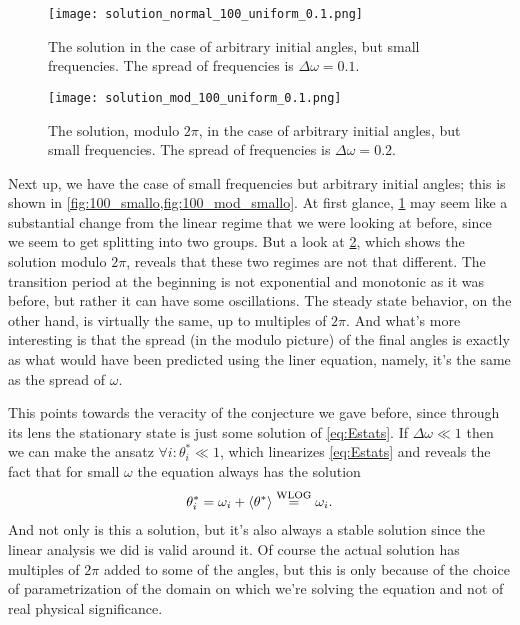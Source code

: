 \documentclass[10pt,a4paper,twocolumn]{article}
\begin{document}
\begin{figure}[!h]
    \centering
    \texttt{[image: solution\_normal\_100\_uniform\_0.1.png]}
    \caption{The solution in the case of arbitrary initial angles, but small frequencies. The spread of frequencies is $\Delta \omega = 0.1$.}
    \label{fig:100_smallo}
\end{figure}

\begin{figure}[!h]
    \centering
    \texttt{[image: solution\_mod\_100\_uniform\_0.1.png]}
    \caption{The solution, modulo $2\pi$, in the case of arbitrary initial angles, but small frequencies. The spread of frequencies is $\Delta \omega = 0.2$.}
    \label{fig:100_mod_smallo}
\end{figure}

Next up, we have the case of small frequencies but arbitrary initial angles; this is shown in \cref{fig:100_smallo,fig:100_mod_smallo}. At first glance, \cref{fig:100_smallo} may seem like a substantial change from the linear regime that we were looking at before, since we seem to get splitting into two groups. But a look at \cref{fig:100_mod_smallo}, which shows the solution modulo $2\pi$, reveals that these two regimes are not that different. The transition period at the beginning is not exponential and monotonic as it was before, but rather it can have some oscillations. The steady state behavior, on the other hand, is virtually the same, up to multiples of $2\pi$. And what's more interesting is that the spread (in the modulo picture) of the final angles is exactly as what would have been predicted using the liner equation, namely, it's the same as the spread of $\omega$.

This points towards the veracity of the conjecture we gave before, since through its lens the stationary state is just some solution of \cref{eq:Estats}. If $\Delta \omega \ll 1$ then we can make the ansatz $\forall i: \theta_i^* \ll 1$, which linearizes \cref{eq:Estats} and reveals the fact that for small $\omega$ the equation always has the solution
%
\begin{align}
    \theta_i^* = \omega_i + \braket{\theta^*} \stackrel{\mathrm{WLOG}}{=} \omega_i.
\end{align} 
%
And not only is this a solution, but it's also always a stable solution since the linear analysis we did is valid around it. Of course the actual solution has multiples of $2\pi$ added to some of the angles, but this is only because of the choice of parametrization of the domain on which we're solving the equation and not of real physical significance.
\end{document}
